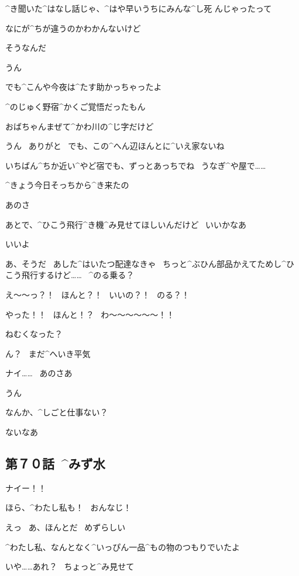 \Nai ^{き}{聞}いた^{はなし}{話}じゃ、^{はや}{早}いうちにみんな^{し}{死}
んじゃったって

\Nai なにが^{ちが}{違}うのかわかんないけど

\Alpha そうなんだ

\Nai うん

\page[54]
\Alpha でも^{こんや}{今夜}は^{たす}{助}かっちゃったよ

\Alpha ^{のじゅく}{野宿}^{かくご}{覚悟}だったもん

\Nai おばちゃんまぜて^{かわ}{川}の^{じ}{字}だけど

\Alpha うん
\ ありがと
\ でも、この^{へん}{辺}ほんとに^{いえ}{家}ないね

\Nai いちばん^{ちか}{近}い^{やど}{宿}でも、ずっとあっちでね
\ うなぎ^{や}{屋}で……

\Alpha ^{きょう}{今日}そっちから^{き}{来}たの

\page[55]
\Alpha あのさ

\Alpha あとで、^{ひこう}{飛行}^{き}{機}^{み}{見}せてほしいんだけど
\ いいかなあ

\Nai いいよ

\Nai あ、そうだ
\ あした^{はいたつ}{配達}なきゃ
\ ちっと^{ぶひん}{部品}かえてためし^{ひこう}{飛行}するけど……
\ ^{のる}{乗る}？

\Alpha え〜〜っ？！
\ ほんと？！
\ いいの？！
\ のる？！

\Alpha やった！！
\ ほんと！？
\ わ〜〜〜〜〜〜！！

\page[57]
\Nai ねむくなった？

\Alpha ん？
\ まだ^{へいき}{平気}

\Alpha ナイ……
\ あのさあ

\Nai うん

\page[58]
\Alpha なんか、^{しごと}{仕事}ない？

\Nai ないなあ


\subsection{第７０話\ ^{みず}{水}}

\page[61]
\Alpha ナイー！！

\page[62]
\Alpha ほら、^{わたし}{私}も！
\ おんなじ！

\Nai えっ
\ あ、ほんとだ
\ めずらしい

\Alpha ^{わたし}{私}、なんとなく^{いっぴん}{一品}^{もの}{物}のつもりでいたよ

\Nai いや……あれ？
\ ちょっと^{み}{見}せて

